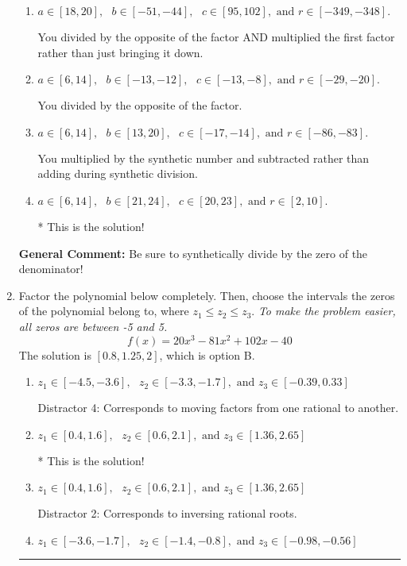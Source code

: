 \documentclass{extbook}[14pt]
\newcommand{\litem}[1]{\item #1

\rule{\textwidth}{0.4pt}}
\begin{document}
\begin{enumerate}
{\begin{enumerate}[label=\Alph*.]
 You multiplied by the synthetic number rather than bringing the first factor down.
\item \( a \in [18, 20], \text{   } b \in [-51, -44], \text{   } c \in [95, 102], \text{   and   } r \in [-349, -348]. \)

 You divided by the opposite of the factor AND multiplied the first factor rather than just bringing it down.
\item \( a \in [6, 14], \text{   } b \in [-13, -12], \text{   } c \in [-13, -8], \text{   and   } r \in [-29, -20]. \)

 You divided by the opposite of the factor.
\item \( a \in [6, 14], \text{   } b \in [13, 20], \text{   } c \in [-17, -14], \text{   and   } r \in [-86, -83]. \)

 You multiplied by the synthetic number and subtracted rather than adding during synthetic division.
\item \( a \in [6, 14], \text{   } b \in [21, 24], \text{   } c \in [20, 23], \text{   and   } r \in [2, 10]. \)

* This is the solution!
\end{enumerate}

\textbf{General Comment:} Be sure to synthetically divide by the zero of the denominator!
}
\litem{
Factor the polynomial below completely. Then, choose the intervals the zeros of the polynomial belong to, where $z_1 \leq z_2 \leq z_3$. \textit{To make the problem easier, all zeros are between -5 and 5.}
\[ f(x) = 20x^{3} -81 x^{2} +102 x -40 \]The solution is \( [0.8, 1.25, 2] \), which is option B.\begin{enumerate}[label=\Alph*.]
\item \( z_1 \in [-4.5, -3.6], \text{   }  z_2 \in [-3.3, -1.7], \text{   and   } z_3 \in [-0.39, 0.33] \)

 Distractor 4: Corresponds to moving factors from one rational to another.
\item \( z_1 \in [0.4, 1.6], \text{   }  z_2 \in [0.6, 2.1], \text{   and   } z_3 \in [1.36, 2.65] \)

* This is the solution!
\item \( z_1 \in [0.4, 1.6], \text{   }  z_2 \in [0.6, 2.1], \text{   and   } z_3 \in [1.36, 2.65] \)

 Distractor 2: Corresponds to inversing rational roots.
\item \( z_1 \in [-3.6, -1.7], \text{   }  z_2 \in [-1.4, -0.8], \text{   and   } z_3 \in [-0.98, -0.56] \)


\end{enumerate}}
\end{enumerate}
\end{document}

